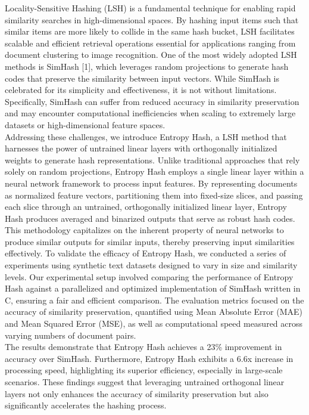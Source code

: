 \documentclass{article}
\begin{document}
Locality-Sensitive Hashing (LSH) is a fundamental technique for enabling rapid similarity searches in high-dimensional spaces. By hashing input items such that similar items are more likely to collide in the same hash bucket, LSH facilitates scalable and efficient retrieval operations essential for applications ranging from document clustering to image recognition.
One of the most widely adopted LSH methods is SimHash [1], which leverages random projections to generate hash codes that preserve the similarity between input vectors. While SimHash is celebrated for its simplicity and effectiveness, it is not without limitations. Specifically, SimHash can suffer from reduced accuracy in similarity preservation and may encounter computational inefficiencies when scaling to extremely large datasets or high-dimensional feature spaces.\\
Addressing these challenges, we introduce Entropy Hash, a LSH method that harnesses the power of untrained linear layers with orthogonally initialized weights to generate hash representations. Unlike traditional approaches that rely solely on random projections, Entropy Hash employs a single linear layer within a neural network framework to process input features. By representing documents as normalized feature vectors, partitioning them into fixed-size slices, and passing each slice through an untrained, orthogonally initialized linear layer, Entropy Hash produces averaged and binarized outputs that serve as robust hash codes. This methodology capitalizes on the inherent property of neural networks to produce similar outputs for similar inputs, thereby preserving input similarities effectively.
To validate the efficacy of Entropy Hash, we conducted a series of experiments using synthetic text datasets designed to vary in size and similarity levels. Our experimental setup involved comparing the performance of Entropy Hash against a parallelized and optimized implementation of SimHash written in C, ensuring a fair and efficient comparison. The evaluation metrics focused on the accuracy of similarity preservation, quantified using Mean Absolute Error (MAE) and Mean Squared Error (MSE), as well as computational speed measured across varying numbers of document pairs.\\
The results demonstrate that Entropy Hash achieves a 23\% improvement in accuracy over SimHash. Furthermore, Entropy Hash exhibits a 6.6x increase in processing speed, highlighting its superior efficiency, especially in large-scale scenarios. These findings suggest that leveraging untrained orthogonal linear layers not only enhances the accuracy of similarity preservation but also significantly accelerates the hashing process.\\
\end{document}
